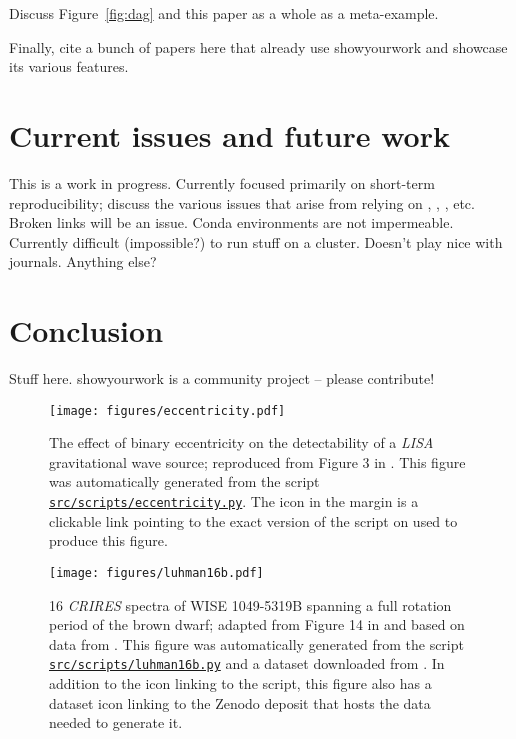 \documentclass{aastex631}
\newcommand\xxx[1]{{\color{red}#1}}
\newcommand\repoargurl{https://github.com/showyourwork/showyourwork-paper}
\newcommand\fileurl[1]{\repoargurl/blob/\GitHubSHA/#1}
\newcommand\repoargfile[1]{\href{\fileurl{#1}}{\texttt{#1}\xspace}}
\begin{document}
\xxx{Discuss Figure~\ref{fig:dag} and this paper as a whole as a meta-example.}

\xxx{Finally, cite a bunch of papers here that already use showyourwork and showcase its various features.}

\section{Current issues and future work}
\label{sec:future}
\xxx{This is a work in progress. Currently focused primarily on short-term reproducibility; discuss the various issues that arise from relying on \GitHub, \conda, \pip, etc. Broken links will be an issue. Conda environments are not impermeable. Currently difficult (impossible?) to run stuff on a cluster. Doesn't play nice with journals. Anything  else?}

\section{Conclusion}
\label{sec:conclusion}
\xxx{Stuff here. showyourwork is a community project -- please contribute!}

\clearpage

\begin{figure}[p!]
    \begin{centering}
        \texttt{[image: figures/eccentricity.pdf]}
        \caption{
            The effect of binary eccentricity on the detectability of a \emph{LISA} gravitational wave source; reproduced from Figure 3 in \citet{Wagg2022}. 
            This figure was automatically generated from the script \repoargfile{src/scripts/eccentricity.py}.
            The \GitHub icon in the margin is a clickable link pointing to the exact version of the script on \GitHub used to produce this figure.
        }
        \label{fig:eccentricity}
    \end{centering}
\end{figure}

\begin{figure}[p!]
    \begin{centering}
        \texttt{[image: figures/luhman16b.pdf]}
        \caption{
            16 \emph{CRIRES} spectra of WISE 1049-5319B spanning a full rotation period of the brown dwarf; adapted from Figure 14 in \citet{Luger2021c} and based on data from \citet{Crossfield2014}.
            This figure was automatically generated from the script \repoargfile{src/scripts/luhman16b.py} and a dataset downloaded from \Zenodo.
            In addition to the \GitHub icon linking to the script, this figure also has a dataset icon linking to the Zenodo deposit that hosts the data needed to generate it.
        }
        \label{fig:luhman16b}
    \end{centering}
\end{figure}
\end{document}

